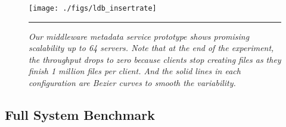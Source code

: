 \begin{figure*}[t]  %
\centerline{\texttt{[image: ./figs/ldb\_insertrate]}}
\vspace{10pt}
\caption{\normalsize
\textit{Our middleware metadata service prototype shows promising scalability
up to 64 servers.
Note that at the end of the experiment,
the throughput drops to zero
because clients stop creating files as they finish 1 million files per client.
And the solid lines in each configuration are Bezier
curves to smooth the variability.}
}
\vspace{10pt}
\hrule
\label{graph:ldb-scaling}
\end{figure*}       %



\subsection{Full System Benchmark}
\label{sec:fullsystem}



